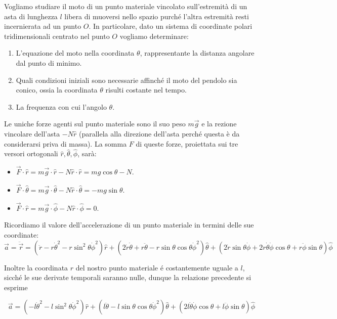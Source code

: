 \documentclass[../main.tex]{subfiles}
\begin{document}

\textex

Vogliamo studiare il moto di un punto materiale vincolato sull'estremità di un asta di lunghezza $l$ libera di muoversi nello spazio purché l'altra estremità resti incernierata ad un punto $O$.
In particolare, dato un sistema di coordinate polari tridimensionali centrato nel punto $O$ vogliamo determinare:
\begin{enumerate}
\item L'equazione del moto nella coordinata $\theta$, rappresentante la distanza angolare dal punto di minimo.
\item Quali condizioni iniziali sono necessarie affinché il moto del pendolo sia conico, ossia la coordinata $\theta$ risulti costante nel tempo.
\item La frequenza con cui l'angolo $\theta$.
\end{enumerate}

\solution
Le uniche forze agenti sul punto materiale sono il suo peso $m\vec{g}$ e la rezione vincolare dell'asta $-N\hat{r}$ (parallela alla direzione dell'asta perch\'e questa \`e da considerarsi priva di massa).
La somma $F$ di queste forze, proiettata sui tre versori ortogonali $\hat{r}, \hat{\theta}, \hat{\phi}$, sar\`a:
\begin{itemize}
 \item $\vec{F}\cdot\hat{r}=m\vec{g}\cdot\hat{r}-N\hat{r}\cdot\hat{r}=mg\cos\theta -N$.
 \item $\vec{F}\cdot\hat{\theta}=m\vec{g}\cdot\hat{\theta}-N\hat{r}\cdot\hat{\theta}=-mg\sin\theta$.
 \item $\vec{F}\cdot\hat{r}=m\vec{g}\cdot\hat{\phi}-N\hat{r}\cdot\hat{\phi}=0$.
\end{itemize}

Ricordiamo il valore dell'accelerazione di un punto materiale in termini delle sue coordinate:
$$ \vec{a}=\ddot{\vec{r}}=(\ddot{r}-r\dot{\theta}^2-r\sin^2{\theta}\dot{\phi}^2)\hat{r}+(2\dot{r}\dot{\theta}+r\ddot{\theta}-r\sin\theta\cos\theta\dot{\phi}^2)\hat{\theta}+(2\dot{r}\sin\theta\dot{\phi}+2r\dot{\theta}\dot{\phi}\cos\theta+r\ddot{\phi}\sin\theta)\hat{\phi} $$

Inoltre la coordinata $r$ del nostro punto materiale \'e costantemente uguale a $l$, sicch\'e le sue derivate temporali saranno nulle, dunque la relazione precedente si esprime

$$\vec{a}=(-l\dot{\theta}^2-l\sin^2{\theta}\dot{\phi}^2)\hat{r}+(l\ddot{\theta}-l\sin\theta\cos\theta\dot{\phi}^2)\hat{\theta}+(2l\dot{\theta}\dot{\phi}\cos\theta+l\ddot{\phi}\sin\theta)\hat{\phi}$$
\end{document}
